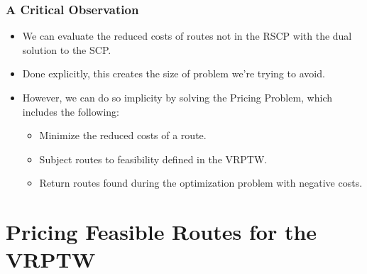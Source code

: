 \documentclass{beamer}
\begin{document}
	\begin{frame}[t]
		\frametitle{A Critical Observation}
		\small
		\begin{itemize}
			\item We can evaluate the reduced costs of routes not in the RSCP with the dual solution to the SCP.
			\item Done explicitly, this creates the size of problem we're trying to avoid.
			\item However, we can do so implicity by solving the Pricing Problem, which includes the following:
			\begin{itemize}
				\item Minimize the reduced costs of a route.
				\item Subject routes to feasibility defined in the VRPTW.
				\item Return routes found during the optimization problem with negative costs.
			\end{itemize}
		\end{itemize}
		\normalsize
	\end{frame}

	\section{Pricing Feasible Routes for the VRPTW}
	
\end{document}
